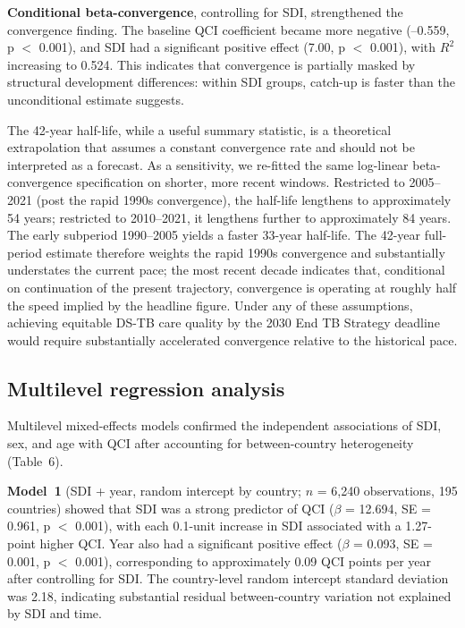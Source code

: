 \documentclass[12pt]{article}
\begin{document}
\textbf{Conditional beta-convergence}, controlling for SDI, strengthened the convergence finding. The baseline QCI coefficient became more negative (--0.559, p $<$ 0.001), and SDI had a significant positive effect (7.00, p $<$ 0.001), with $R^2$ increasing to 0.524. This indicates that convergence is partially masked by structural development differences: within SDI groups, catch-up is faster than the unconditional estimate suggests.

The 42-year half-life, while a useful summary statistic, is a theoretical extrapolation that assumes a constant convergence rate and should not be interpreted as a forecast. As a sensitivity, we re-fitted the same log-linear beta-convergence specification on shorter, more recent windows. Restricted to 2005--2021 (post the rapid 1990s convergence), the half-life lengthens to approximately 54 years; restricted to 2010--2021, it lengthens further to approximately 84 years. The early subperiod 1990--2005 yields a faster 33-year half-life. The 42-year full-period estimate therefore weights the rapid 1990s convergence and substantially understates the current pace; the most recent decade indicates that, conditional on continuation of the present trajectory, convergence is operating at roughly half the speed implied by the headline figure. Under any of these assumptions, achieving equitable DS-TB care quality by the 2030 End TB Strategy deadline would require substantially accelerated convergence relative to the historical pace.

\subsection{Multilevel regression analysis}

Multilevel mixed-effects models confirmed the independent associations of SDI, sex, and age with QCI after accounting for between-country heterogeneity (Table~6).

\textbf{Model~1} (SDI + year, random intercept by country; $n$ = 6{,}240 observations, 195 countries) showed that SDI was a strong predictor of QCI ($\beta$ = 12.694, SE = 0.961, p $<$ 0.001), with each 0.1-unit increase in SDI associated with a 1.27-point higher QCI. Year also had a significant positive effect ($\beta$ = 0.093, SE = 0.001, p $<$ 0.001), corresponding to approximately 0.09 QCI points per year after controlling for SDI. The country-level random intercept standard deviation was 2.18, indicating substantial residual between-country variation not explained by SDI and time.
\end{document}
